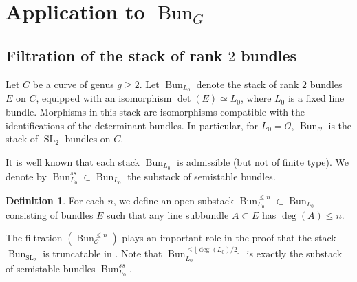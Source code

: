 \documentclass[12pt,reqno]{amsart}
\newtheorem{lemma}[theorem]{Lemma}
\theoremstyle{definition}
\newtheorem{definition}[theorem]{Definition}
\theoremstyle{remark}
\numberwithin{equation}{section}
\newcommand{\Ext}{\operatorname{Ext}}
\newcommand{\OO}{{\mathcal O}}
\newcommand{\sub}{\subset}
\newcommand{\SL}{{\operatorname{SL}}}
\newcommand{\Bun}{{\operatorname{Bun}}}
\begin{document}
\section{Application to $\Bun_G$}\label{Bun-sec}

\subsection{Filtration of the stack of rank $2$ bundles}\label{filtr-sec}

Let $C$ be a curve of genus $g\ge 2$.
Let $\Bun_{L_0}$ denote the stack of rank $2$ bundles $E$ on $C$, equipped with an isomorphism $\det(E)\simeq L_0$, where $L_0$ is a fixed line bundle.
Morphisms in this stack are isomorphisms compatible with the identifications of the determinant bundles. 
In particular, for $L_0=\OO$, $\Bun_{\OO}$ is the stack of $\SL_2$-bundles on $C$. 

It is well known that each stack $\Bun_{L_0}$ is admissible (but not of finite type).
We denote by $\Bun^{ss}_{L_0}\sub \Bun_{L_0}$ the substack of semistable bundles. 

\begin{definition}
For each $n$, we define an open substack $\Bun_{L_0}^{\le n}\sub \Bun_{L_0}$ consisting of bundles $E$ such that any line subbundle $A\sub E$ has $\deg(A)\le n$.
\end{definition}

The filtration $(\Bun_{\OO}^{\le n})$ plays an important role in the proof that the stack $\Bun_{\SL_2}$ is truncatable in \cite[Sec.\ 6]{DG}.
Note that $\Bun_{L_0}^{\le \lfloor \deg(L_0)/2 \rfloor}$ is exactly the substack of semistable bundles $\Bun^{ss}_{L_0}$.



\end{document}
